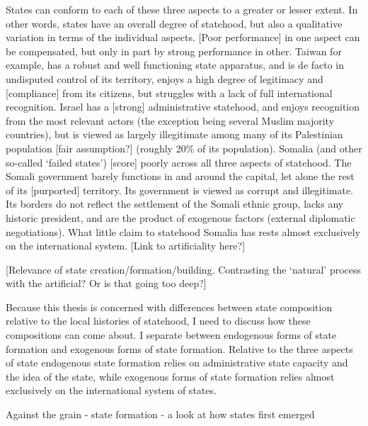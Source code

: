 \documentclass[12pt]{article}
\begin{document}
States can conform to each of these three aspects to a greater or lesser extent.
In other words, states have an overall degree of statehood, but also a
qualitative variation in terms of the individual aspects. [Poor performance] in
one aspect can be compensated, but only in part by strong performance in other.
Taiwan for example, has a robust and well functioning state apparatus, and is de
facto in undisputed control of its territory, enjoys a high degree of legitimacy
and [compliance] from its citizens, but struggles with a lack of full
international recognition. Israel has a [strong] administrative statehood, and
enjoys recognition from the most relevant actors (the exception being several
Muslim majority countries), but is viewed as largely illegitimate among many of
its Palestinian population [fair assumption?] (roughly 20\% of its population).
Somalia (and other so-called `failed states') [score] poorly across all three
aspects of statehood. The Somali government barely functions in and around the
capital, let alone the rest of its [purported] territory. Its government is
viewed as corrupt and illegitimate. Its borders do not reflect the settlement of
the Somali ethnic group, lacks any historic president, and are the product of
exogenous factors (external diplomatic negotiations). What little claim to
statehood Somalia has rests almost exclusively on the international system.
[Link to artificiality here?]

[Relevance of state creation/formation/building. Contrasting the `natural'
process with the artificial? Or is that going too deep?] 

Because this thesis is concerned with differences between state composition
relative to the local histories of statehood, I need to discuss how these
compositions can come about. I separate between endogenous forms of state
formation and exogenous forms of state formation. Relative to the three aspects
of state endogenous state formation relies on administrative state capacity and
the idea of the state, while exogenous forms of state formation relies almost
exclusively on the international system of states.

\citet{scott2017against} Against the grain - state formation - a look at how
states first emerged
\end{document}
